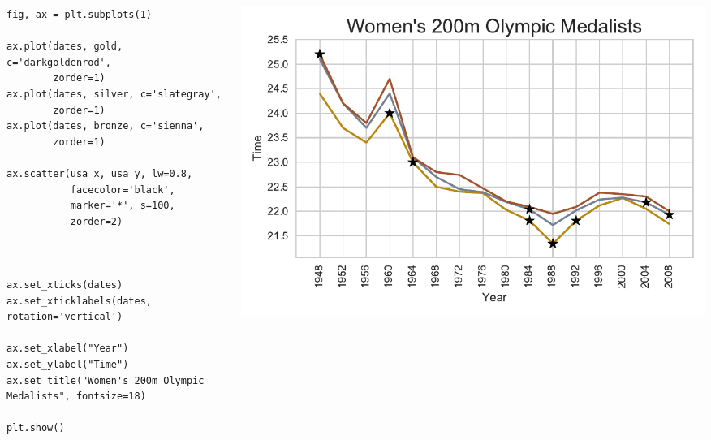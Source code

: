 \documentclass{beamer}
\begin{document}
\begin{frame}[fragile]
\tiny{
\begin{columns}
\begin{column}{0.45\textwidth}
\begin{verbatim}
fig, ax = plt.subplots(1)

ax.plot(dates, gold, c='darkgoldenrod',
        zorder=1)
ax.plot(dates, silver, c='slategray',
        zorder=1)
ax.plot(dates, bronze, c='sienna',
        zorder=1)

ax.scatter(usa_x, usa_y, lw=0.8,
           facecolor='black',
           marker='*', s=100,
           zorder=2)



ax.set_xticks(dates)
ax.set_xticklabels(dates, rotation='vertical')

ax.set_xlabel("Year")
ax.set_ylabel("Time")
ax.set_title("Women's 200m Olympic Medalists", fontsize=18)

plt.show()
\end{verbatim}
\end{column}
\begin{column}{0.55\textwidth}
\includegraphics[width=\textwidth]{olympics_6.pdf}
\end{column}
\end{columns}
}
\end{frame}
\end{document}
